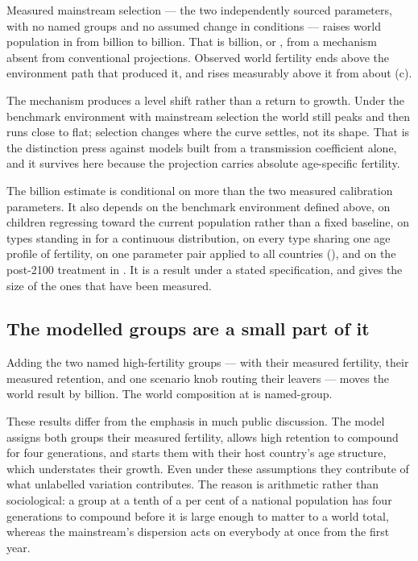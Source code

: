 Measured mainstream selection --- the two independently sourced parameters, with
no named groups and no assumed change in conditions --- raises world population
in \ProjectionEndYear{} from \LadderBenchmark{} billion to \LadderMainstream{}
billion. That is \LadderMainstreamGain{} billion, or
\LadderMainstreamGainPercent{}, from a mechanism absent from conventional
projections. Observed world fertility ends \RaceSelectionEffectPercent{} above
the environment path that produced it, and rises measurably above it from about
\SelectionOvertakesYear{} (c).

The mechanism produces a level shift rather than a return to growth. Under the benchmark
environment with mainstream selection the world still peaks and then runs close
to flat; selection changes where the curve settles, not its shape. That is the
distinction \citet{arenberg2022} press against models built from a transmission
coefficient alone, and it survives here because the projection carries absolute
age-specific fertility.

The \LadderMainstreamGain{} billion estimate is conditional on more than the two
measured calibration parameters. It also depends on the benchmark environment defined above,
on children regressing toward the current population rather than a fixed
baseline, on \MainstreamTypes{} types standing in for a continuous distribution,
on every type sharing one age profile of fertility, on one parameter pair applied
to all countries (), and on the post-2100 treatment in
. It is a result under a stated specification, and
 gives the size of the ones that have been measured.

\subsection{The modelled groups are a small part of it}

Adding the two named high-fertility groups --- with their measured fertility,
their measured retention, and one scenario knob routing their leavers --- moves
the world result by \LadderNamedGroupsGain{} billion. The world composition at
\ProjectionEndYear{} is \CompositionGroupShare{} named-group.

These results differ from the emphasis in much public discussion. The model
assigns both groups their measured fertility, allows high retention to compound
for four generations, and starts them with their host country's age structure,
which understates their growth. Even under these assumptions they contribute
\NamedGroupShareOfMechanism{} of what unlabelled variation contributes. The
reason is arithmetic rather than sociological: a group at a tenth of a per cent
of a national population has four generations to compound before it is large
enough to matter to a world total, whereas the mainstream's dispersion acts on
everybody at once from the first year.

